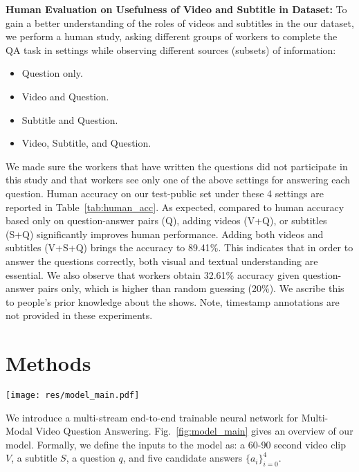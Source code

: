 \documentclass[11pt,a4paper]{article}
\begin{document}
\noindent\textbf{Human Evaluation on Usefulness of Video and Subtitle in Dataset:} To gain a better understanding of the roles of videos and subtitles in the our dataset, we perform a human study, asking different groups of workers to complete the QA task in settings while observing different sources (subsets) of information:
\begin{itemize}[itemsep=1mm, parsep=0pt]
    \item Question only. 
    \item Video and Question.
    \item Subtitle and Question.
    \item Video, Subtitle, and Question.
\end{itemize}
\noindent We made sure the workers that have written the questions did not participate in this study and that workers see only one of the above settings for answering each question. 
Human accuracy on our test-public set under these 4 settings are reported in Table~\ref{tab:human_acc}. As expected, compared to human accuracy based only on question-answer pairs (Q), adding videos (V+Q), or subtitles (S+Q) significantly improves human performance. Adding both videos and subtitles (V+S+Q) brings the accuracy to 89.41\%. This indicates that in order to answer the questions correctly, both visual and textual understanding are essential.
We also observe that workers obtain 32.61\% accuracy given question-answer pairs only, which is higher than random guessing (20\%).
We ascribe this to people's prior knowledge about the shows. Note, timestamp annotations are not provided in these experiments.
 \section{Methods}
\begin{figure*}[h!]
  \texttt{[image: res/model\_main.pdf]}
  \vspace{-20pt}
  \caption{Illustration of our multi-stream model for Multi-Modal Video QA. Our full model takes different contextual sources (regional visual features, visual concept features, and subtitles) along with question-answer pair as inputs to each stream. For brevity, we only show regional visual features (upper) and subtitle (bottom) streams.}
  \label{fig:model_main}
  \vspace{-5pt}
\end{figure*}


We introduce a multi-stream end-to-end trainable neural network for Multi-Modal Video Question Answering. Fig.~\ref{fig:model_main} gives an overview of our model. Formally, we define the inputs to the model as: a 60-90 second video clip $V$,  a subtitle $S$, a question $q$, and five candidate answers $\{a_i\}_{i=0}^4$.
\end{document}
